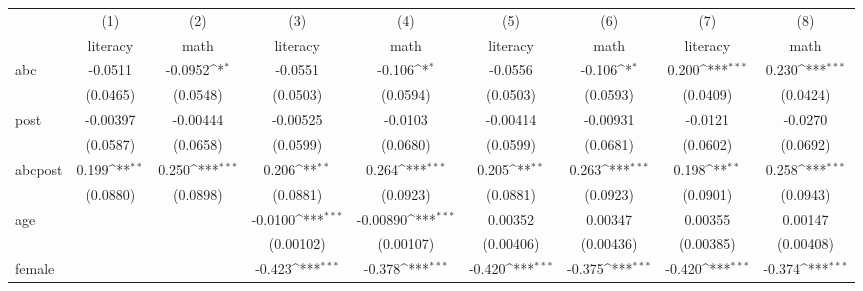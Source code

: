 {
\def\sym#1{\ifmmode^{#1}\else\(^{#1}\)\fi}
\begin{tabular}{l*{8}{c}}
\toprule
            &\multicolumn{1}{c}{(1)}&\multicolumn{1}{c}{(2)}&\multicolumn{1}{c}{(3)}&\multicolumn{1}{c}{(4)}&\multicolumn{1}{c}{(5)}&\multicolumn{1}{c}{(6)}&\multicolumn{1}{c}{(7)}&\multicolumn{1}{c}{(8)}\\
            &\multicolumn{1}{c}{literacy}&\multicolumn{1}{c}{math}&\multicolumn{1}{c}{literacy}&\multicolumn{1}{c}{math}&\multicolumn{1}{c}{literacy}&\multicolumn{1}{c}{math}&\multicolumn{1}{c}{literacy}&\multicolumn{1}{c}{math}\\
\midrule
abc         &     -0.0511         &     -0.0952\sym{*}  &     -0.0551         &      -0.106\sym{*}  &     -0.0556         &      -0.106\sym{*}  &       0.200\sym{***}&       0.230\sym{***}\\
            &    (0.0465)         &    (0.0548)         &    (0.0503)         &    (0.0594)         &    (0.0503)         &    (0.0593)         &    (0.0409)         &    (0.0424)         \\
\addlinespace
post        &    -0.00397         &    -0.00444         &    -0.00525         &     -0.0103         &    -0.00414         &    -0.00931         &     -0.0121         &     -0.0270         \\
            &    (0.0587)         &    (0.0658)         &    (0.0599)         &    (0.0680)         &    (0.0599)         &    (0.0681)         &    (0.0602)         &    (0.0692)         \\
\addlinespace
abcpost     &       0.199\sym{**} &       0.250\sym{***}&       0.206\sym{**} &       0.264\sym{***}&       0.205\sym{**} &       0.263\sym{***}&       0.198\sym{**} &       0.258\sym{***}\\
            &    (0.0880)         &    (0.0898)         &    (0.0881)         &    (0.0923)         &    (0.0881)         &    (0.0923)         &    (0.0901)         &    (0.0943)         \\
\addlinespace
age         &                     &                     &     -0.0100\sym{***}&    -0.00890\sym{***}&     0.00352         &     0.00347         &     0.00355         &     0.00147         \\
            &                     &                     &   (0.00102)         &   (0.00107)         &   (0.00406)         &   (0.00436)         &   (0.00385)         &   (0.00408)         \\
\addlinespace
female      &                     &                     &      -0.423\sym{***}&      -0.378\sym{***}&      -0.420\sym{***}&      -0.375\sym{***}&      -0.420\sym{***}&      -0.374\sym{***}\\

\end{tabular}}
